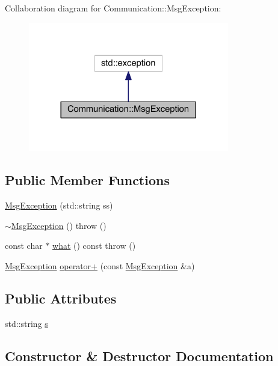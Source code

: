 Collaboration diagram for Communication\+:\+:Msg\+Exception\+:\nopagebreak
\begin{figure}[H]
\begin{center}
\leavevmode
\includegraphics[width=248pt]{class_communication_1_1_msg_exception__coll__graph}
\end{center}
\end{figure}
\subsection*{Public Member Functions}
\begin{DoxyCompactItemize}
\item 
\hyperlink{class_communication_1_1_msg_exception_a9f4e492558fcd74e02d1ff537304405a}{Msg\+Exception} (std\+::string ss)
\item 
\hyperlink{class_communication_1_1_msg_exception_a432c93911fd3a86a25a7c67030354802}{$\sim$\+Msg\+Exception} ()  throw ()
\item 
const char $\ast$ \hyperlink{class_communication_1_1_msg_exception_a5cba01611547fcc6bd31b4350b7b6707}{what} () const   throw ()
\item 
\hyperlink{class_communication_1_1_msg_exception}{Msg\+Exception} \hyperlink{class_communication_1_1_msg_exception_aeab0c0d7be0771085804269e9883736e}{operator+} (const \hyperlink{class_communication_1_1_msg_exception}{Msg\+Exception} \&a)
\end{DoxyCompactItemize}
\subsection*{Public Attributes}
\begin{DoxyCompactItemize}
\item 
std\+::string \hyperlink{class_communication_1_1_msg_exception_a756442e1d08528bf1c5fad3b630db13f}{s}
\end{DoxyCompactItemize}


\subsection{Constructor \& Destructor Documentation}
\hypertarget{class_communication_1_1_msg_exception_a9f4e492558fcd74e02d1ff537304405a}{}
